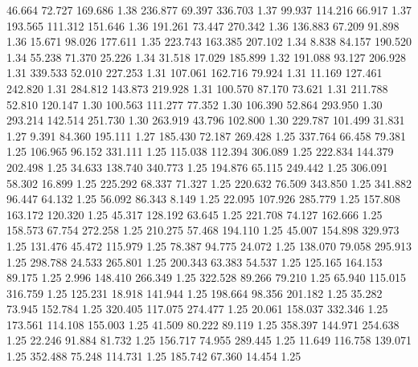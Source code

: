   46.664   72.727  169.686         1.38
 236.877   69.397  336.703         1.37
  99.937  114.216   66.917         1.37
 193.565  111.312  151.646         1.36
 191.261   73.447  270.342         1.36
 136.883   67.209   91.898         1.36
  15.671   98.026  177.611         1.35
 223.743  163.385  207.102         1.34
   8.838   84.157  190.520         1.34
  55.238   71.370   25.226         1.34
  31.518   17.029  185.899         1.32
 191.088   93.127  206.928         1.31
 339.533   52.010  227.253         1.31
 107.061  162.716   79.924         1.31
  11.169  127.461  242.820         1.31
 284.812  143.873  219.928         1.31
 100.570   87.170   73.621         1.31
 211.788   52.810  120.147         1.30
 100.563  111.277   77.352         1.30
 106.390   52.864  293.950         1.30
 293.214  142.514  251.730         1.30
 263.919   43.796  102.800         1.30
 229.787  101.499   31.831         1.27
   9.391   84.360  195.111         1.27
 185.430   72.187  269.428         1.25
 337.764   66.458   79.381         1.25
 106.965   96.152  331.111         1.25
 115.038  112.394  306.089         1.25
 222.834  144.379  202.498         1.25
  34.633  138.740  340.773         1.25
 194.876   65.115  249.442         1.25
 306.091   58.302   16.899         1.25
 225.292   68.337   71.327         1.25
 220.632   76.509  343.850         1.25
 341.882   96.447   64.132         1.25
  56.092   86.343    8.149         1.25
  22.095  107.926  285.779         1.25
 157.808  163.172  120.320         1.25
  45.317  128.192   63.645         1.25
 221.708   74.127  162.666         1.25
 158.573   67.754  272.258         1.25
 210.275   57.468  194.110         1.25
  45.007  154.898  329.973         1.25
 131.476   45.472  115.979         1.25
  78.387   94.775   24.072         1.25
 138.070   79.058  295.913         1.25
 298.788   24.533  265.801         1.25
 200.343   63.383   54.537         1.25
 125.165  164.153   89.175         1.25
   2.996  148.410  266.349         1.25
 322.528   89.266   79.210         1.25
  65.940  115.015  316.759         1.25
 125.231   18.918  141.944         1.25
 198.664   98.356  201.182         1.25
  35.282   73.945  152.784         1.25
 320.405  117.075  274.477         1.25
  20.061  158.037  332.346         1.25
 173.561  114.108  155.003         1.25
  41.509   80.222   89.119         1.25
 358.397  144.971  254.638         1.25
  22.246   91.884   81.732         1.25
 156.717   74.955  289.445         1.25
  11.649  116.758  139.071         1.25
 352.488   75.248  114.731         1.25
 185.742   67.360   14.454         1.25
